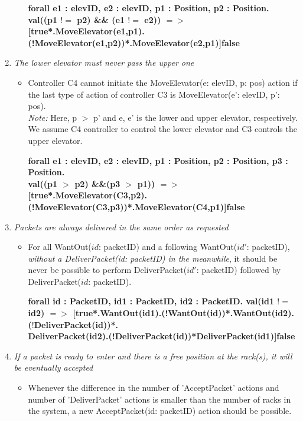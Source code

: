 \begin{enumerate}
\begin{itemize}
	\textbf{forall e1 : elevID, e2 : elevID, p1 : Position, p2 : Position.\\val((p1 $!=$ p2) \&\& (e1 $!=$ e2)) $=>$ [true*.MoveElevator(e1,p1).\\(!MoveElevator(e1,p2))*.MoveElevator(e2,p1)]false}

	\end{itemize}
		
\item \textit{The lower elevator must never pass the upper one}
	\begin{itemize}
	\item Controller C4 cannot initiate the MoveElevator(e: elevID, p: pos) 
	action if the last type of action of controller C3 is MoveElevator(e': elevID, p': pos).\\
	\textit{Note:} Here, p $>$ p' and e, e' is the lower and 
	upper elevator, respectively. We assume C4 controller to control
	the lower elevator and C3 controls the upper elevator.
	
	\textbf{forall e1 : elevID, e2 : elevID, p1 : Position, p2 : Position, p3 : Position.\\ val((p1 $>$ p2) \&\&(p3 $>$ p1)) $=>$ [true*.MoveElevator(C3,p2).\\(!MoveElevator(C3,p3))*.MoveElevator(C4,p1)]false}
	\end{itemize}
	
\item \textit{Packets are always delivered in the same order as
	requested}	
	\begin{itemize}
	\item 
	For all WantOut($id$: packetID) and a following WantOut($id'$: 
	packetID), \textit{without a DeliverPacket(id: packetID) in the meanwhile}, it
	should be never be possible to perform DeliverPacket($id'$: 
	packetID) followed by DeliverPacket($id$: packetID).
	
   \textbf{forall id : PacketID, id1 : PacketID, id2 : PacketID. val(id1 $!=$ id2) $=>$ [true*.WantOut(id1).(!WantOut(id))*.WantOut(id2).($!$DeliverPacket(id))*.\\DeliverPacket(id2).(!DeliverPacket(id))*DeliverPacket(id1)]false}
   
	\end{itemize}
	
\item \textit{If a packet is ready to enter and there is a free
	position at the rack(s), it will be eventually accepted}
	\begin{itemize}
	\item Whenever the difference in the number of 'AcceptPacket'
	actions and number of 'DeliverPacket' actions is  smaller than the
	number of racks in the system, a new AcceptPacket(id: packetID)
	action should be possible.
	

\end{itemize}
\end{enumerate}
